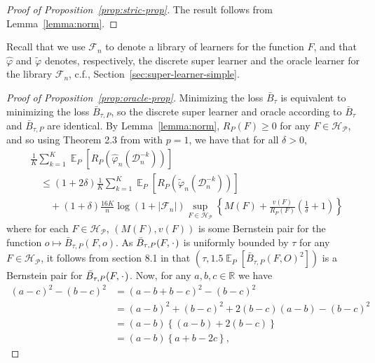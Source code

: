 \documentclass[lineno]{biometrika}
\DeclareMathOperator{\E}{\mathbb{E}} %
\newcommand{\R}{\mathbb{R}}
\newcommand{\blank}{\makebox[1ex]{\textbf{$\cdot$}}}
\renewcommand{\phi}{\varphi}
\newcommand{\1}{\mathds{1}}
\newcommand{\data}{\ensuremath{\mathcal{D}}}
\begin{document}
\begin{proof}[Proof of Proposition~\ref{prop:stric-prop}]
  The result follows from Lemma~\ref{lemma:norm}.
\end{proof}

Recall that we use \( \mathcal{F}_n \) to denote a library of learners for the
function \( F \), and that \( \hat{\phi} \) and \( \tilde{\phi} \) denotes,
respectively, the discrete super learner and the oracle learner for the library
\( \mathcal{F}_n \), c.f., Section~\ref{sec:super-learner-simple}.

\begin{proof}[Proof of Proposition~\ref{prop:oracle-prop}]
  Minimizing the loss \( \bar{B}_{\tau} \) is equivalent to
  minimizing the loss \( \bar{B}_{\tau,P} \), so the discrete super learner and
  oracle according to \( \bar{B}_{\tau} \) and \( \bar{B}_{\tau,P} \) are
  identical. By Lemma~\ref{lemma:norm}, \( R_P(F) \geq 0 \) for any
  \( F \in \mathcal{H}_{\mathcal{P}} \), and so using Theorem 2.3 from
  \citep{vaart2006oracle} with \( p=1 \), we have that for all \( \delta >0 \),
\begin{align*}
  & \frac{1}{K} \sum_{k=1}^{K} \E_{P}{\left[ R_P(\hat{\phi}_n(\data_n^{-k})) \right]}
  \\
  &  \quad \leq
    (1+2\delta)\frac{1}{K} \sum_{k=1}^{K}\E_{P}{\left[ R_P(\tilde{\phi}_n(\data_n^{-k})) \right]}
  \\
  & \qquad + (1+\delta) \frac{16 K}{n}
    \log(1 + |\mathcal{F}_n|)\sup_{F \in \mathcal{H}_{\mathcal{P}}}
    \left\{
    M(F) + \frac{v(F)}{R_P(F)}
    \left(
    \frac{1}{\delta} + 1
    \right)
    \right\}
\end{align*}
where for each \( F \in \mathcal{H}_{\mathcal{P}} \),
\( (M(F), v(F)) \) is some Bernstein pair for the function
\(o \mapsto \bar{B}_{\tau,P}(F, o) \). As
\( \bar{B}_{\tau,P}(F, \blank) \) is uniformly bounded by \( \tau \)
for any \( F \in \mathcal{H}_{\mathcal{P}} \), it follows from section
8.1 in \citep{vaart2006oracle} that
\( (\tau, 1.5 \E_P{[\bar{B}_{\tau,P}(F, O)^2]}) \) is a Bernstein
pair for \( \bar{B}_{\tau,P}(F, \blank) \). Now, for any
\( a,b,c \in \R \) we have
\begin{align*}
  (a-c)^2 - (b-c)^2
  & = (a-b+b-c)^2 - (b-c)^2
  \\
  & = (a-b)^2 + (b-c)^2 +2(b-c)(a-b) - (b-c)^2
  \\
  & = (a-b)
    \left\{
    (a-b) +  2(b-c)
    \right\}
  \\
  & = (a-b)
    \left\{
     a + b -2c
    \right\},

\end{align*}
\end{proof}
\end{document}
